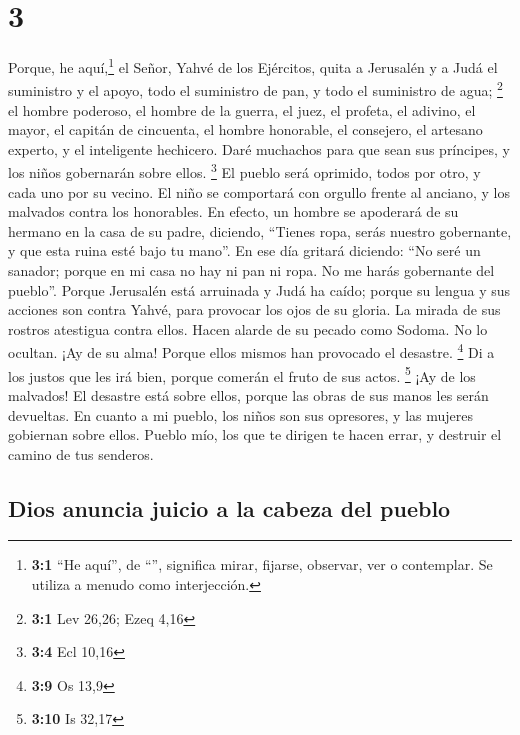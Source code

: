 \hypertarget{section-2}{%
\section{3}\label{section-2}}

 Porque, he aquí,\footnote{\textbf{3:1} ``He aquí'', de
  ``'', significa mirar, fijarse, observar, ver o
  contemplar. Se utiliza a menudo como interjección.} el Señor, Yahvé de
los Ejércitos, quita a Jerusalén y a Judá el suministro y el apoyo, todo
el suministro de pan, y todo el suministro de agua; \footnote{\textbf{3:1}
  Lev 26,26; Ezeq 4,16}  el hombre poderoso, el hombre de
la guerra, el juez, el profeta, el adivino, el mayor,  el
capitán de cincuenta, el hombre honorable, el consejero, el artesano
experto, y el inteligente hechicero.  Daré muchachos para
que sean sus príncipes, y los niños gobernarán sobre ellos. \footnote{\textbf{3:4}
  Ecl 10,16}  El pueblo será oprimido, todos por otro, y
cada uno por su vecino. El niño se comportará con orgullo frente al
anciano, y los malvados contra los honorables.  En efecto,
un hombre se apoderará de su hermano en la casa de su padre, diciendo,
``Tienes ropa, serás nuestro gobernante, y que esta ruina esté bajo tu
mano''.  En ese día gritará diciendo: ``No seré un
sanador; porque en mi casa no hay ni pan ni ropa. No me harás gobernante
del pueblo''.  Porque Jerusalén está arruinada y Judá ha
caído; porque su lengua y sus acciones son contra Yahvé, para provocar
los ojos de su gloria.  La mirada de sus rostros atestigua
contra ellos. Hacen alarde de su pecado como Sodoma. No lo ocultan. ¡Ay
de su alma! Porque ellos mismos han provocado el desastre. \footnote{\textbf{3:9}
  Os 13,9}  Di a los justos que les irá bien, porque
comerán el fruto de sus actos. \footnote{\textbf{3:10} Is 32,17}
 ¡Ay de los malvados! El desastre está sobre ellos,
porque las obras de sus manos les serán devueltas.  En
cuanto a mi pueblo, los niños son sus opresores, y las mujeres gobiernan
sobre ellos. Pueblo mío, los que te dirigen te hacen errar, y destruir
el camino de tus senderos.

\hypertarget{dios-anuncia-juicio-a-la-cabeza-del-pueblo}{%
\subsection{Dios anuncia juicio a la cabeza del
pueblo}\label{dios-anuncia-juicio-a-la-cabeza-del-pueblo}}

